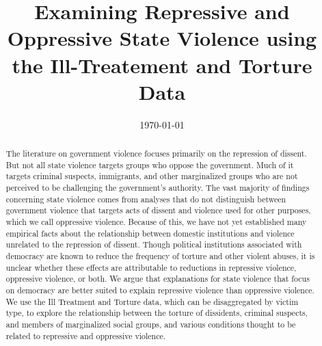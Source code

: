 \documentclass[11pt]{article}
\begin{document}
\date{\today}
\title{Examining Repressive and Oppressive State Violence using the Ill-Treatement and Torture Data}
\author{%
}

\maketitle 

\begin{abstract}
The literature on government violence focuses primarily on the repression of dissent. But not all state violence targets groups who oppose the government. Much of it targets criminal suspects, immigrants, and other marginalized groups who are not perceived to be challenging the government's authority. The vast majority of findings concerning state violence comes from analyses that do not distinguish between government violence that targets acts of dissent and violence used for other purposes, which we call oppressive violence. Because of this, we have not yet established many empirical facts about the relationship between domestic institutions and violence unrelated to the repression of dissent. Though political institutions associated with democracy are known to reduce the frequency of torture and other violent abuses, it is unclear whether these effects are attributable to reductions in repressive violence, oppressive violence, or both. We argue that explanations for state violence that focus on democracy are better suited to explain repressive violence than oppressive violence. We use the Ill Treatment and Torture data, which can be disaggregated by victim type, to explore the relationship between the torture of dissidents, criminal suspects, and members of marginalized social groups, and various conditions thought to be related to repressive and oppressive violence. 
\end{abstract}

\clearpage
\setcounter{page}{1}

\doublespace
\end{document}
